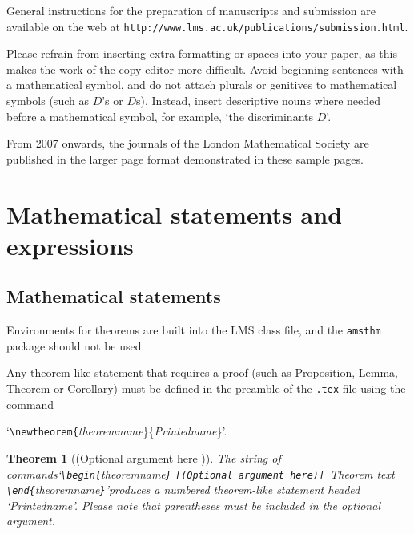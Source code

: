 \documentclass{lms}
\newtheorem{theorem}{Theorem}[section] %
\begin{document}
General instructions for the preparation of manuscripts and
submission are available on the web at
\verb"http://www.lms.ac.uk/publications/submission.html".

Please refrain from inserting extra formatting or spaces into your
paper, as this makes the work of the copy-editor more difficult.
Avoid beginning sentences with a mathematical symbol, and do not attach plurals or genitives
to mathematical symbols (such as $D$'s or $D$s). Instead,
insert descriptive nouns where needed before a
mathematical symbol, for example, `the discriminants $D$'.

\begin{note*}%
From 2007 onwards, the journals of the London Mathematical Society
are published in the larger page format demonstrated in these
sample pages.
\end{note*}

\section{Mathematical statements and expressions}

\subsection{Mathematical statements}

Environments for theorems are built into the LMS class file, and
the \verb"amsthm" package should not be used.

Any theorem-like statement that requires a proof (such as
Proposition, Lemma, Theorem or Corollary) must be defined in the
preamble of the {\tt .tex} file using the command
\begin{center}`\verb"\newtheorem{"{\em theoremname}\}\{{\em Printedname}\}'.\end{center}

\begin{theorem}[(Optional argument here {\cite[p.\,193]{Lamport}})]%
\label{mythm}
The string of commands\break`\verb"\begin{"theoremname\verb"}"%
\verb"[(Optional argument here)] "Theorem
text\verb" \end{"theoremname\verb"}"\/'\break produces a numbered
theorem-like statement headed `Printedname'. Please note that\break
parentheses must be included in the optional argument.
\end{theorem}
\end{document}
